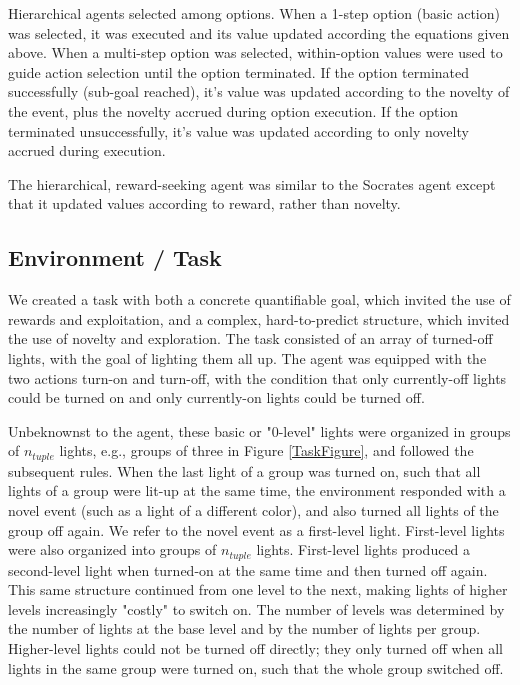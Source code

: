 \documentclass{article}
\begin{document}
Hierarchical agents selected among options. When a 1-step option (basic action) was selected, it was executed and its value updated according the equations given above. When a multi-step option was selected, within-option values were used to guide action selection until the option terminated. If the option terminated successfully (sub-goal reached), it's value was updated according to the novelty of the event, plus the novelty accrued during option execution. If the option terminated unsuccessfully, it's value was updated according to only novelty accrued during execution. 

The hierarchical, reward-seeking agent was similar to the Socrates agent except that it updated values according to reward, rather than novelty.


\subsection{Environment / Task}

We created a task with both a concrete quantifiable goal, which invited the use of rewards and exploitation, and a complex, hard-to-predict structure, which invited the use of novelty and exploration. The task consisted of an array of turned-off lights, with the goal of lighting them all up. The agent was equipped with the two actions turn-on and turn-off, with the condition that only currently-off lights could be turned on and only currently-on lights could be turned off.

Unbeknownst to the agent, these basic or "0-level" lights were organized in groups of $n_{tuple}$ lights, e.g., groups of three in Figure \ref{TaskFigure}, and followed the subsequent rules. When the last light of a group was turned on, such that all lights of a group were lit-up at the same time, the environment responded with a novel event (such as a light of a different color), and also turned all lights of the group off again. We refer to the novel event as a first-level light. First-level lights were also organized into groups of $n_{tuple}$ lights. First-level lights produced a second-level light when turned-on at the same time and then turned off again. This same structure continued from one level to the next, making lights of higher levels increasingly "costly" to switch on. The number of levels was determined by the number of lights at the base level and by the number of lights per group. Higher-level lights could not be turned off directly; they only turned off when all lights in the same group were turned on, such that the whole group switched off.
\end{document}
